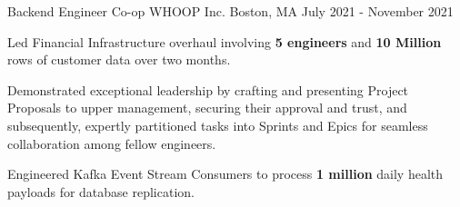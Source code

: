 \begin{cventries}
  \cventry
    {Backend Engineer Co-op} %
    {WHOOP Inc.} %
    {Boston, MA} %
    {July 2021 - November 2021} %
    {
      \begin{cvitems} %
        \item {Led Financial Infrastructure overhaul involving \textbf{5 engineers} and \textbf{10 Million} rows of customer data over two months.}
        \item {Demonstrated exceptional leadership by crafting and presenting Project Proposals to upper management, securing their approval and trust, and subsequently, expertly partitioned tasks into Sprints and Epics for seamless collaboration among fellow engineers.}
        \item {Engineered Kafka Event Stream Consumers to process \textbf{1 million} daily health payloads for database replication.}
      \end{cvitems}
    }
    

\end{cventries}
